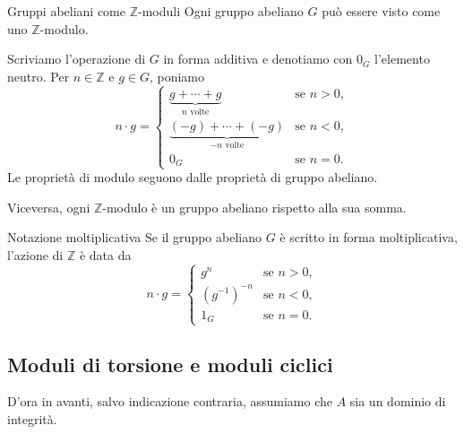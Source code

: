 \documentclass[a4paper]{article}
\begin{document}
\begin{radioactive}
\begin{snippetexample}{Gruppi abeliani come \(\mathbb{Z}\)-moduli}
    Ogni gruppo abeliano \(G\) può essere visto come uno \(\mathbb{Z}\)-modulo.

    Scriviamo l'operazione di \(G\) in forma additiva e denotiamo con \(0_G\) l'elemento neutro. Per \(n\in\mathbb{Z}\) e \(g\in G\), poniamo
    \[
        n\cdot g=
        \begin{cases}
            \underbrace{g+\cdots+g}_{n \text{ volte}} & \text{se } n>0,\\
            \underbrace{(-g)+\cdots+(-g)}_{-n \text{ volte}} & \text{se } n<0,\\
            0_G & \text{se } n=0.
        \end{cases}
    \]
    Le proprietà di modulo seguono dalle proprietà di gruppo abeliano.

    Viceversa, ogni \(\mathbb{Z}\)-modulo è un gruppo abeliano rispetto alla sua somma.
\end{snippetexample}
\end{radioactive}

\begin{radioactive}
\begin{snippetremark}{Notazione moltiplicativa}
    Se il gruppo abeliano \(G\) è scritto in forma moltiplicativa, l'azione di \(\mathbb{Z}\) è data da
    \[
        n\cdot g=
        \begin{cases}
            g^n & \text{se } n>0,\\
            (g^{-1})^{-n} & \text{se } n<0,\\
            1_G & \text{se } n=0.
        \end{cases}
    \]
\end{snippetremark}
\end{radioactive}

\pagebreak

\subsection{Moduli di torsione e moduli ciclici}

\begin{radioactive}
D'ora in avanti, salvo indicazione contraria, assumiamo che \(A\) sia un dominio di integrità.
\end{radioactive}
\end{document}
